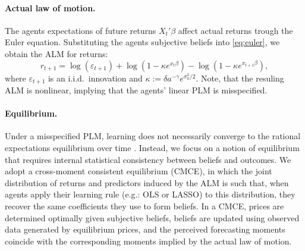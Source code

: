 \documentclass[11pt]{article}
\begin{document}
\paragraph{Actual law of motion.}
The agents expectations of future returns $X_t'\beta$ affect actual returns trough the Euler equation.
Substituting the agents subjective beliefs into \ref{eq:euler}, we obtain the ALM for returns: 
\begin{equation}\label{eq:alm_univariate}
    r_{t+1} = \log(\varepsilon_{t+1}) + \log(1 - \kappa e^{x_{t} \beta}) - \log(1 - \kappa e^{x_{t+1} \beta}),
\end{equation}
where $\varepsilon_{t+1}$ is an i.i.d.\ innovation and $\kappa := \delta a^{- \gamma} e^{\sigma^2_u / 2}$.
Note, that the resuling ALM is nonlinear, implying that the agents’ linear PLM is misspecified.

\paragraph{Equilibrium.}
Under a misspecified PLM, learning does not necessarily converge to the rational expectations equilibrium over time \citep{Honkapohja2003}.
Instead, we focus on a notion of equilibrium that requires internal statistical consistency between beliefs and outcomes.
We adopt a cross-moment consistent equilibrium (CMCE), in which the joint distribution of returns and predictors induced by the ALM is such that, when agents apply their learning rule (e.g.: OLS or LASSO) to this distribution, they recover the same coefficients they use to form beliefs.
In a CMCE, prices are determined optimally given subjective beliefs, beliefs are updated using observed data generated by equilibrium prices, and the perceived forecasting moments coincide with the corresponding moments implied by the actual law of motion.
\end{document}
